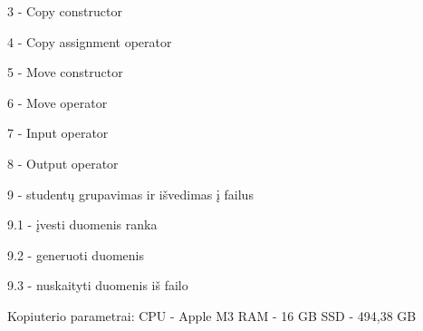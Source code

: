 3 -\/ Copy constructor 

4 -\/ Copy assignment operator 

5 -\/ Move constructor 

6 -\/ Move operator 

7 -\/ Input operator 

8 -\/ Output operator 

9 -\/ studentų grupavimas ir išvedimas į failus \begin{DoxyVerb}9.1 - įvesti duomenis ranka

9.2 - generuoti duomenis

9.3 - nuskaityti duomenis iš failo
\end{DoxyVerb}


Kopiuterio parametrai\+: CPU -\/ Apple M3 RAM -\/ 16 GB SSD -\/ 494,38 GB 